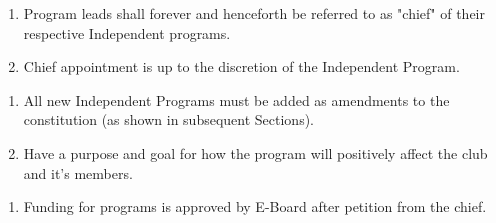 


\begin{enumerate}
  \item Program leads shall forever and henceforth be referred to as "chief" of
    their respective Independent programs.
  \item Chief appointment is up to the discretion of the Independent Program.
\end{enumerate}


\begin{enumerate}
  \item All new Independent Programs must be added as amendments to the
    constitution (as shown in subsequent Sections).
  \item Have a purpose and goal for how the program will positively affect the
    club and it’s members.
\end{enumerate}


\begin{enumerate}
  \item Funding for programs is approved by E-Board after petition from the
    chief.
\end{enumerate}




